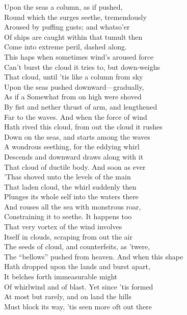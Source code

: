 Upon the seas a column, as if pushed,\\
Round which the surges seethe, tremendously\\
Aroused by puffing gusts; and whatso'er\\
Of ships are caught within that tumult then\\
Come into extreme peril, dashed along.\\
This haps when sometimes wind's aroused force\\
Can't burst the cloud it tries to, but down-weighs\\
That cloud, until 'tis like a column from sky\\
Upon the seas pushed downward—gradually,\\
As if a Somewhat from on high were shoved\\
By fist and nether thrust of arm, and lengthened\\
Far to the waves. And when the force of wind\\
Hath rived this cloud, from out the cloud it rushes\\
Down on the seas, and starts among the waves\\
A wondrous seething, for the eddying whirl\\
Descends and downward draws along with it\\
That cloud of ductile body. And soon as ever\\
'Thas shoved unto the levels of the main\\
That laden cloud, the whirl suddenly then\\
Plunges its whole self into the waters there\\
And rouses all the sea with monstrous roar,\\
Constraining it to seethe. It happens too\\
That very vortex of the wind involves\\
Itself in clouds, scraping from out the air\\
The seeds of cloud, and counterfeits, as 'twere,\\
The ``bellows'' pushed from heaven. And when this shape\\
Hath dropped upon the lands and burst apart,\\
It belches forth immeasurable might\\
Of whirlwind and of blast. Yet since 'tis formed\\
At most but rarely, and on land the hills\\
Must block its way, 'tis seen more oft out there\\
